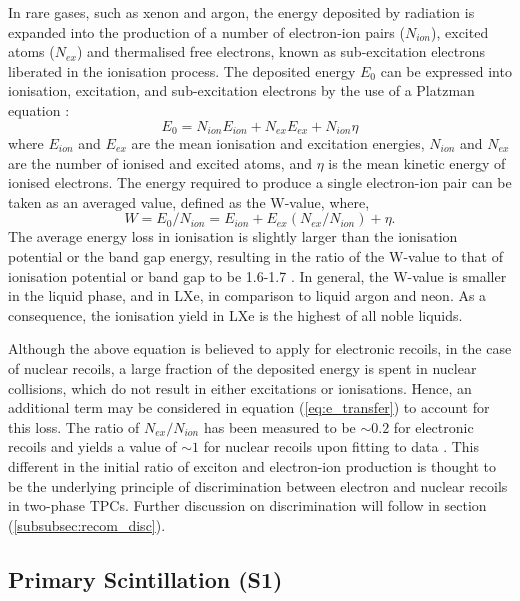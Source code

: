 In rare gases, such as xenon and argon, the energy deposited by radiation is expanded into the production of a number of electron-ion pairs ($N_{ion}$), excited atoms ($N_{ex}$) and thermalised free electrons, known as sub-excitation electrons liberated in the ionisation process. The deposited energy $E_{0}$ can be expressed into ionisation, excitation, and sub-excitation electrons by the use of a Platzman equation \cite{Platzman, xenon_physics}:
%
\begin{equation} \label{eq:e_transfer}
    E_{0} = N_{ion}E_{ion} + N_{ex}E_{ex} + N_{ion}\eta
\end{equation} 
%
where $E_{ion}$ and $E_{ex}$ are the mean ionisation and excitation energies, $N_{ion}$ and $N_{ex}$ are the number of ionised and excited atoms, and $\eta$ is the mean kinetic energy of ionised electrons. The energy required to produce a single electron-ion pair can be taken as an averaged value, defined as the W-value, where,
%
\begin{equation} \label{eq:e_transfer}
    W = E_{0}/N_{ion} = E_{ion} + E_{ex}(N_{ex}/N_{ion}) + \eta.
\end{equation} 
%
The average energy loss in ionisation is slightly larger than the ionisation potential or the band gap energy, resulting in the ratio of the W-value to that of ionisation potential or band gap to be 1.6-1.7 \cite{PhysRevA.48.1313}. In general, the W-value is smaller in the liquid phase, and in LXe, in comparison to liquid argon and neon. As a consequence, the ionisation yield in LXe is the highest of all noble liquids.

Although the above equation is believed to apply for electronic recoils, in the case of nuclear recoils, a large fraction of the deposited energy is spent in nuclear collisions, which do not result in either excitations or ionisations. Hence, an additional term may be considered in equation (\ref{eq:e_transfer}) to account for this loss. The ratio of $N_{ex}/N_{ion}$ has been measured to be $\sim0.2$ for electronic recoils and yields a value of $\sim1$ for nuclear recoils upon fitting to data \cite{xenon_physics, Dahl}. This different in the initial ratio of exciton and electron-ion production is thought to be the underlying principle of discrimination between electron and nuclear recoils in two-phase TPCs. Further discussion on discrimination will follow in section (\ref{subsubsec:recom_disc}).


\subsection{Primary Scintillation (S1)}
\label{subsec:s1}


